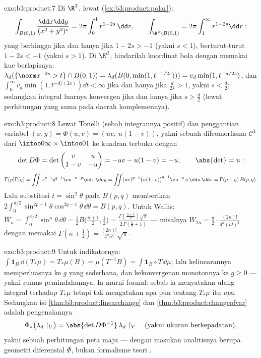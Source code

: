 \begin{solution}{exo:b3:product:7}
Di $\R^2$, lewat  (\cref{ex:b3:product:polar}):
\[
\int_{B(0,1)}\frac{\dd x\dd y}{(x^2+y^2)^s}
= 2\pi\int_0^1 r^{1 - 2s}\,\dd r,
\qquad
\int_{\R^2\setminus B(0,1)} = 2\pi\int_1^\infty r^{1-2s}\dd r:
\]
yang berhingga jika dan hanya jika $1 - 2s > -1$ (yakni $s < 1$), berturut-turut $1 - 2s < -1$ (yakni $s >
1$). Di $\R^d$, hindarilah koordinat bola dengan memakai kue
berlapisnya: $\lambda_d(\{\norm x^{-2s} > t\}\cap B(0,1)) =
\lambda_d(B(0, \min(1, t^{-1/2s}))) = v_d\min(1, t^{-d/2s})$,
dan $\int_0^\infty v_d\min(1, t^{-d/(2s)})\dd t < \infty$ jika dan hanya jika
$\frac d{2s} > 1$, yakni $s < \frac d2$; sedangkan integral luarnya
konvergen jika dan hanya jika $s > \frac d2$ (lewat perhitungan yang sama pada daerah
komplemennya).
\end{solution}

\begin{solution}{exo:b3:product:8}
Lewat Tonelli (sebab integrannya positif) dan penggantian variabel
$(x, y) = \Phi(u, v) = (uv,\ u(1-v))$, yakni sebuah difeomorfisma
$\mathcal C^1$ dari $\intoo0\infty\times\intoo01$ ke kuadran
terbuka dengan
\[
\det D\Phi = \det\begin{pmatrix} v & u\\ 1 - v & -u
\end{pmatrix} = -uv - u(1 - v) = -u,
\qquad \abs{\det} = u :
\]
\[
\Gamma(p)\Gamma(q) =
\iint x^{p-1}y^{q-1}\eu^{-x-y}\dd x\,\dd y
= \iint (uv)^{p-1}\bigl(u(1{-}v)\bigr)^{q-1}\eu^{-u}\,u\,
\dd u\,\dd v
= \Gamma(p + q)\,B(p, q).
\]
Lalu substitusi $t = \sin^2\theta$ pada $B(p,q)$ memberikan
$2\int_0^{\pi/2}\sin^{2p-1}\theta\cos^{2q-1}\theta\,\dd\theta =
B(p, q)$. Untuk Wallis: $W_n =
\int_0^{\pi/2}\sin^n\theta\,\dd\theta = \frac12B\bigl(\frac{n +
1}2, \frac12\bigr) = \frac{\Gamma(\frac{n+1}2)\sqrt\pi}
{2\,\Gamma(\frac n2 + 1)}$ --- misalnya $W_{2n} =
\frac\pi2\cdot\frac{(2n)!}{4^n(n!)^2}$ dengan memakai
$\Gamma(n + \frac12) = \frac{(2n)!}{4^nn!}\sqrt\pi$.
\end{solution}

\begin{solution}{exo:b3:product:9}
Untuk indikatornya: $\int\mathbf 1_B\,\dd(T_*\mu) = T_*\mu(B) =
\mu(T^{-1}B) = \int\mathbf 1_B\circ T\,\dd\mu$; lalu kelinearannya
memperluasnya ke $g$ yang sederhana, dan kekonvergenan monotonnya ke $g \geq 0$ --- yakni rumus
pemindahannya. Ia murni formal: sebab ia menyatakan ulang integral terhadap
$T_*\mu$ tetapi tak mengatakan apa pun tentang $T_*\mu$ itu \emph{apa}. Sedangkan
isi \cref{thm:b3:product:linearchange} dan
\cref{thm:b3:product:changeofvar} adalah pengenalannya
\[
\Phi_*\bigl(\lambda_d\restriction_U\bigr) =
\abs{\det D\Phi^{-1}}\,\lambda_d\restriction_V
\quad\text{(yakni ukuran berkepadatan)},
\]
yakni sebuah perhitungan peta maju  ---
dengan masukan analitisnya berupa geometri diferensial $\Phi$,
bukan formalisme teori .
\end{solution}

